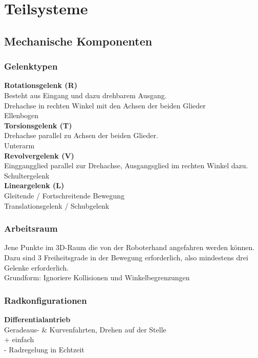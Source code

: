 

\section{Teilsysteme}%
\label{ts:sec:teilsysteme}

\subsection{Mechanische Komponenten}%
\label{ts:sub:mechanische-komponenten}
\subsubsection{Gelenktypen}%
\label{ts:ssub:gelenktypen}
\textbf{Rotationsgelenk (R)}\\
Besteht aus Eingang und dazu drehbarem Ausgang.\\
Drehachse in rechten Winkel mit den Achsen der beiden Glieder\\
Ellenbogen\\

\textbf{Torsionsgelenk (T)}\\
Drehachse parallel zu Achsen der beiden Glieder.\\
Unterarm\\

\textbf{Revolvergelenk (V)}\\
Einggangglied parallel zur Drehachse, Ausgangsglied im rechten Winkel dazu.\\
Schultergelenk\\

\textbf{Lineargelenk (L)}\\
Gleitende / Fortschreitende Bewegung\\
Translationsgelenk / Schubgelenk

\subsubsection{Arbeitsraum}%
\label{ts:ssub:arbeitsraum}
Jene Punkte im 3D-Raum die von der Roboterhand angefahren werden können. Dazu sind 3 Freiheitsgrade in der
Bewegung erforderlich, also mindestens drei Gelenke erforderlich.\\
Grundform: Ignoriere Kollisionen und Winkelbegrenzungen

\subsubsection{Radkonfigurationen}%
\label{ts:ssub:radkonfigurationen}
\textbf{Differentialantrieb}\\
Geradeaus- \& Kurvenfahrten, Drehen auf der Stelle\\
+ einfach\\
- Radregelung in Echtzeit\\

